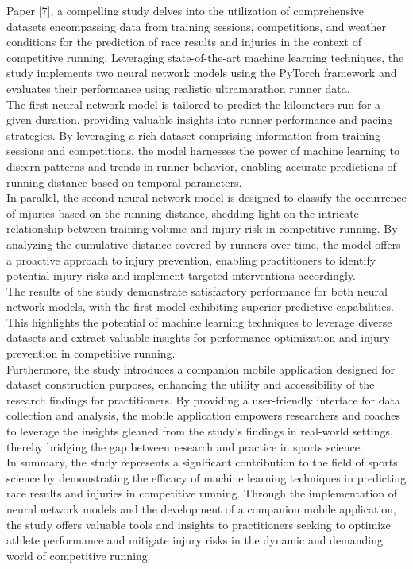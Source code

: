 \documentclass[12pt, English]{article}
\begin{document}
\begin{normalsize}
Paper [7], a compelling study delves into the utilization of comprehensive datasets encompassing data from training sessions, competitions, and weather conditions for the prediction of race results and injuries in the context of competitive running. Leveraging state-of-the-art machine learning techniques, the study implements two neural network models using the PyTorch framework and evaluates their performance using realistic ultramarathon runner data.\\
The first neural network model is tailored to predict the kilometers run for a given duration, providing valuable insights into runner performance and pacing strategies. By leveraging a rich dataset comprising information from training sessions and competitions, the model harnesses the power of machine learning to discern patterns and trends in runner behavior, enabling accurate predictions of running distance based on temporal parameters.\\
In parallel, the second neural network model is designed to classify the occurrence of injuries based on the running distance, shedding light on the intricate relationship between training volume and injury risk in competitive running. By analyzing the cumulative distance covered by runners over time, the model offers a proactive approach to injury prevention, enabling practitioners to identify potential injury risks and implement targeted interventions accordingly.\\
The results of the study demonstrate satisfactory performance for both neural network models, with the first model exhibiting superior predictive capabilities. This highlights the potential of machine learning techniques to leverage diverse datasets and extract valuable insights for performance optimization and injury prevention in competitive running.\\
Furthermore, the study introduces a companion mobile application designed for dataset construction purposes, enhancing the utility and accessibility of the research findings for practitioners. By providing a user-friendly interface for data collection and analysis, the mobile application empowers researchers and coaches to leverage the insights gleaned from the study's findings in real-world settings, thereby bridging the gap between research and practice in sports science.\\
In summary, the study represents a significant contribution to the field of sports science by demonstrating the efficacy of machine learning techniques in predicting race results and injuries in competitive running. Through the implementation of neural network models and the development of a companion mobile application, the study offers valuable tools and insights to practitioners seeking to optimize athlete performance and mitigate injury risks in the dynamic and demanding world of competitive running.
\\


\end{normalsize}
\end{document}
